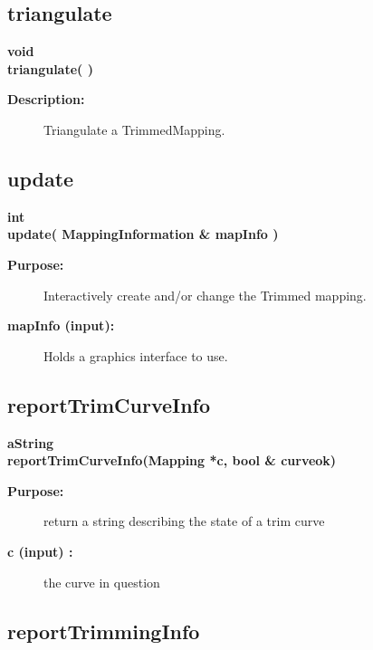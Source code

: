 \subsection{triangulate}
 
\begin{flushleft} \textbf{%
void  \\ 
\settowidth{\TrimmedMappingIncludeArgIndent}{triangulate(}%
triangulate( )
}\end{flushleft}
\begin{description}
\item[{\bf Description:}] 
    Triangulate a TrimmedMapping.
\end{description}
\subsection{update}
 
\begin{flushleft} \textbf{%
int  \\ 
\settowidth{\TrimmedMappingIncludeArgIndent}{update(}%
update( MappingInformation \& mapInfo ) 
}\end{flushleft}
\begin{description}
\item[{\bf Purpose:}]  Interactively create and/or change the Trimmed mapping.
\item[{\bf mapInfo (input):}]  Holds a graphics interface to use.
\end{description}
\subsection{reportTrimCurveInfo}
 
\begin{flushleft} \textbf{%
aString  \\ 
\settowidth{\TrimmedMappingIncludeArgIndent}{reportTrimCurveInfo(}%
reportTrimCurveInfo(Mapping *c, bool \& curveok)
}\end{flushleft}
\begin{description}
\item[{\bf Purpose:}]  return a string describing the state of a trim curve
\item[{\bf c (input) :}]  the curve in question
\end{description}
\subsection{reportTrimmingInfo}
 
